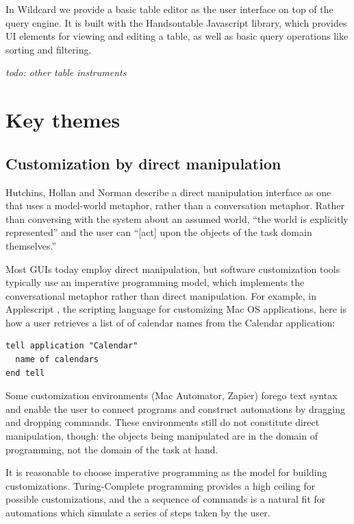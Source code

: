 \documentclass[sigplan,10pt,anonymous,review]{acmart}
\begin{document}
In Wildcard we provide a basic table editor as the user interface on top
of the query engine. It is built with the Handsontable Javascript
library, which provides UI elements for viewing and editing a table, as
well as basic query operations like sorting and filtering.

\emph{todo: other table instruments}

\hypertarget{sec:themes}{%
\section{Key themes}\label{sec:themes}}

\hypertarget{customization-by-direct-manipulation}{%
\subsection{Customization by direct
manipulation}\label{customization-by-direct-manipulation}}

Hutchins, Hollan and Norman \citep{hutchins1985} describe a direct
manipulation interface as one that uses a model-world metaphor, rather
than a conversation metaphor. Rather than conversing with the system
about an assumed world, ``the world is explicitly represented'' and the
user can ``{[}act{]} upon the objects of the task domain themselves.''

Most GUIs today employ direct manipulation, but software customization
tools typically use an imperative programming model, which implements
the conversational metaphor rather than direct manipulation. For
example, in Applescript \citep{cook2007}, the scripting language for
customizing Mac OS applications, here is how a user retrieves a list of
of calendar names from the Calendar application:

\begin{verbatim}
tell application "Calendar"
  name of calendars
end tell
\end{verbatim}

Some customization environments (Mac Automator, Zapier) forego text
syntax and enable the user to connect programs and construct automations
by dragging and dropping commands. These environments still do not
constitute direct manipulation, though: the objects being manipulated
are in the domain of programming, not the domain of the task at hand.

It is reasonable to choose imperative programming as the model for
building customizations. Turing-Complete programming provides a high
ceiling for possible customizations, and the a sequence of commands is a
natural fit for automations which simulate a series of steps taken by
the user.
\end{document}
